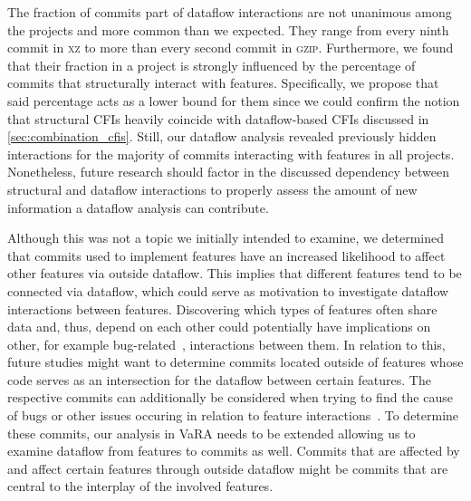 The fraction of commits part of dataflow interactions are not unanimous among the projects and more common than we expected.
They range from every ninth commit in \textsc{xz} to more than every second commit in \textsc{gzip}.
Furthermore, we found that their fraction in a project is strongly influenced by the percentage of commits that structurally interact with features.
Specifically, we propose that said percentage acts as a lower bound for them since we could confirm the notion that structural CFIs heavily coincide with dataflow-based CFIs discussed in \autoref{sec:combination_cfis}.
Still, our dataflow analysis revealed previously hidden interactions for the majority of commits interacting with features in all projects.
Nonetheless, future research should factor in the discussed dependency between structural and dataflow interactions to properly assess the amount of new information a dataflow analysis can contribute. 

Although this was not a topic we initially intended to examine, we determined that commits used to implement features have an increased likelihood to affect other features via outside dataflow.
This implies that different features tend to be connected via dataflow, which could serve as motivation to investigate dataflow interactions between features.
Discovering which types of features often share data and, thus, depend on each other could potentially have implications on other, for example bug-related~\cite{nie2011survey}, interactions between them.
In relation to this, future studies might want to determine commits located outside of features whose code serves as an intersection for the dataflow between certain features.
The respective commits can additionally be considered when trying to find the cause of bugs or other issues occuring in relation to feature interactions~\cite{apel2014feature}.
To determine these commits, our analysis in VaRA needs to be extended allowing us to examine dataflow from features to commits as well.
Commits that are affected by and affect certain features through outside dataflow might be commits that are central to the interplay of the involved features. 

